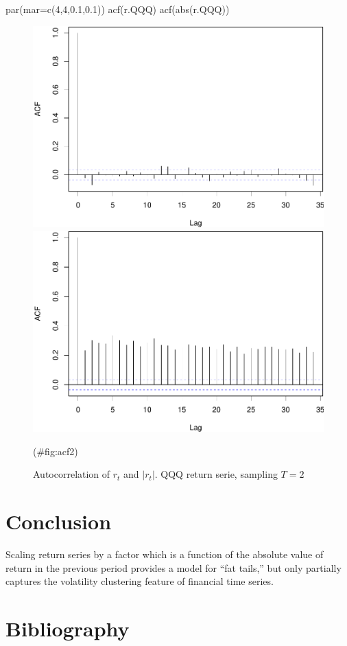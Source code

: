 \documentclass[
  11pt,
]{article}
\newenvironment{Shaded}{\begin{snugshade}}{\end{snugshade}}
\newcommand{\AttributeTok}[1]{\textcolor[rgb]{0.77,0.63,0.00}{#1}}
\newcommand{\DecValTok}[1]{\textcolor[rgb]{0.00,0.00,0.81}{#1}}
\newcommand{\FloatTok}[1]{\textcolor[rgb]{0.00,0.00,0.81}{#1}}
\newcommand{\FunctionTok}[1]{\textcolor[rgb]{0.00,0.00,0.00}{#1}}
\newcommand{\NormalTok}[1]{#1}
\begin{document}
\begin{Shaded}
\begin{Highlighting}[]
\FunctionTok{par}\NormalTok{(}\AttributeTok{mar=}\FunctionTok{c}\NormalTok{(}\DecValTok{4}\NormalTok{,}\DecValTok{4}\NormalTok{,}\FloatTok{0.1}\NormalTok{,}\FloatTok{0.1}\NormalTok{))}
\FunctionTok{acf}\NormalTok{(r.QQQ)}
\FunctionTok{acf}\NormalTok{(}\FunctionTok{abs}\NormalTok{(r.QQQ))}
\end{Highlighting}
\end{Shaded}

\begin{figure}[H]
\includegraphics[width=0.5\linewidth]{figs/acf2-1} \includegraphics[width=0.5\linewidth]{figs/acf2-2} \caption{Autocorrelation of $r_t$ and $|r_t|$. QQQ return serie, sampling $T=2$}(\#fig:acf2)
\end{figure}

\hypertarget{conclusion}{%
\section{Conclusion}\label{conclusion}}

Scaling return series by a factor which is a function of the absolute
value of return in the previous period provides a model for ``fat
tails,'' but only partially captures the volatility clustering feature
of financial time series.

\hypertarget{bibliography}{%
\section*{Bibliography}\label{bibliography}}
\end{document}

